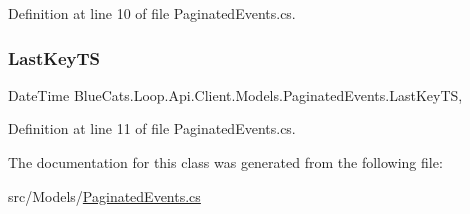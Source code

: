 Definition at line 10 of file Paginated\+Events.\+cs.

\mbox{\label{class_blue_cats_1_1_loop_1_1_api_1_1_client_1_1_models_1_1_paginated_events_ad969ee23be5f52022d86bdadb3bc0ce2}} 
\subsubsection{\texorpdfstring{Last\+Key\+TS}{LastKeyTS}}
{\footnotesize\ttfamily Date\+Time Blue\+Cats.\+Loop.\+Api.\+Client.\+Models.\+Paginated\+Events.\+Last\+Key\+TS\hspace{0.3cm}{\ttfamily [get]}, {\ttfamily [set]}}



Definition at line 11 of file Paginated\+Events.\+cs.



The documentation for this class was generated from the following file\+:\begin{DoxyCompactItemize}
\item 
src/\+Models/\mbox{\hyperlink{_paginated_events_8cs}{Paginated\+Events.\+cs}}\end{DoxyCompactItemize}
